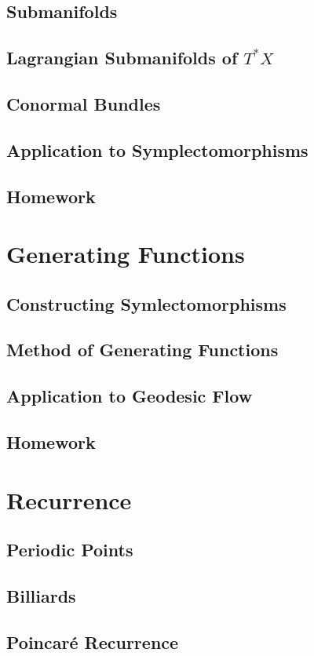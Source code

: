 \documentclass[4paper]{article}
\begin{document}
\subsection{Submanifolds}
\subsection{Lagrangian Submanifolds of $ T^*X $}
\subsection{Conormal Bundles}
\subsection{Application to Symplectomorphisms}
\subsection{Homework}
\section{Generating Functions}
\subsection{Constructing Symlectomorphisms}
\subsection{Method of Generating Functions}
\subsection{Application to Geodesic Flow}
\subsection{Homework}
\section{Recurrence}
\subsection{Periodic Points}
\subsection{Billiards}
\subsection{Poincar\'{e} Recurrence}
\end{document}
